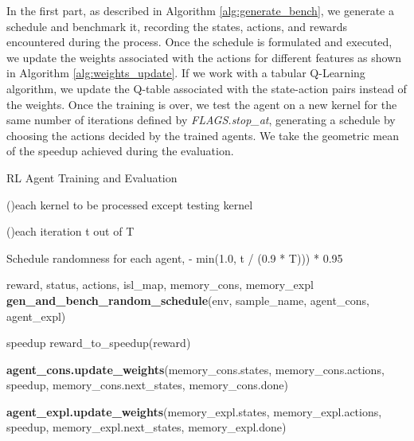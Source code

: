 \documentclass[logo,msc]{infthesis}           %
\begin{document}
In the first part, as described in Algorithm \ref{alg:generate_bench}, we generate a schedule and benchmark it, recording the states, actions, and rewards encountered during the process. Once the schedule is formulated and executed, we update the weights associated with the actions for different features as shown in Algorithm \ref{alg:weights_update}. If we work with a tabular Q-Learning algorithm, we update the Q-table associated with the state-action pairs instead of the weights. Once the training is over, we test the agent on a new kernel for the same number of iterations defined by \textit{FLAGS.stop\_at}, generating a schedule by choosing the actions decided by the trained agents. We take the geometric mean \cite{10.1145/5666.5673} of the speedup achieved during the evaluation.

\begin{algorithm}[H]
\caption{RL Agent Training and Evaluation}\label{alg:agent_training}


\For(){each kernel to be processed except testing kernel}
{    
    \For(){each iteration t out of T}
    {
        
        Schedule randomness for each agent, \epsilon {} - min{\hspace{2}}(1.0,{\hspace{2}} t / (0.9 * T))) * {\hspace{2}}0.95
         
         reward, status, actions, isl\_map, memory\_cons, memory\_expl \gets \textbf{gen\_and\_bench\_random\_schedule}(env, sample\_name, agent\_cons, agent\_expl)
         
         speedup \gets reward\_to\_speedup(reward)
         
         \textbf{agent\_cons.update\_weights}(memory\_cons.states,
                                    memory\_cons.actions,
                                    speedup, memory\_cons.next\_states,
                                    memory\_cons.done)
                                    
         \textbf{agent\_expl.update\_weights}(memory\_expl.states,
                                    memory\_expl.actions,
                                    speedup, memory\_expl.next\_states,
                                    memory\_expl.done)
       
}}
\end{algorithm}
\end{document}

